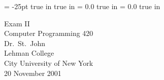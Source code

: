 \pagestyle{empty}
\topmargin= -25pt
 true in
 true in
\oddsidemargin = 0.0 true in
\evensidemargin = 0.0 true in
\newcommand{\ul}{\underline}
\newcommand{\spa}{\hspace{.25in}}


{\large
\begin{center}
    Exam II\\
    Computer Programming 420 \\
    Dr.~St.~John\\ 
    Lehman College\\
    City University of New York\\ 
    20 November 2001
\end{center}
}

